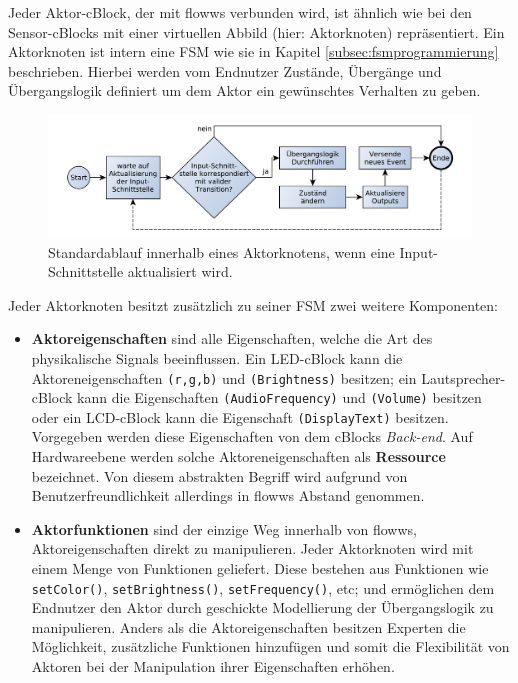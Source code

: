 Jeder Aktor-cBlock, der mit flowws verbunden wird, ist ähnlich wie bei den Sensor-cBlocks mit einer virtuellen Abbild (hier: Aktorknoten) repräsentiert. Ein Aktorknoten ist intern eine \ac{FSM} wie sie in Kapitel \ref{subsec:fsmprogrammierung} beschrieben. Hierbei werden vom Endnutzer Zustände, Übergänge und Übergangslogik definiert um dem Aktor ein gewünschtes Verhalten zu geben.

 \begin{figure}[h]
  \centering
  \includegraphics[width=1\textwidth]{bilder/chapter4/chapter4_2/aktorblockablauf.pdf}
  \caption{Standardablauf innerhalb eines Aktorknotens, wenn eine Input-Schnittstelle aktualisiert wird.}
  \label{fig:seqaktorblock}
\end{figure}

Jeder Aktorknoten besitzt zusätzlich zu seiner \ac{FSM} zwei weitere Komponenten:
\begin{itemize}
    \item \textbf{Aktoreigenschaften} sind alle Eigenschaften, welche die Art des physikalische Signals beeinflussen. Ein LED-cBlock kann die Aktoreneigenschaften \texttt{(r,g,b)} und \texttt{(Brightness)} besitzen; ein Lautsprecher-cBlock kann die Eigenschaften \texttt{(AudioFrequency)} und \texttt{(Volume)} besitzen oder ein LCD-cBlock kann die Eigenschaft \texttt{(DisplayText)} besitzen. Vorgegeben werden diese Eigenschaften von dem cBlocks \textit{Back-end}. Auf Hardwareebene werden solche Aktoreneigenschaften als \textbf{Ressource} bezeichnet. Von diesem abstrakten Begriff wird aufgrund von Benutzerfreundlichkeit allerdings in flowws Abstand genommen.
    \item \textbf{Aktorfunktionen} sind der einzige Weg innerhalb von flowws, Aktoreigenschaften direkt zu manipulieren. Jeder Aktorknoten wird mit einem Menge von Funktionen geliefert. Diese bestehen aus Funktionen wie \texttt{setColor()}, \texttt{setBrightness()}, \texttt{setFrequency()}, etc; und ermöglichen dem Endnutzer den Aktor durch geschickte Modellierung der Übergangslogik zu manipulieren. Anders als die Aktoreigenschaften besitzen Experten die Möglichkeit, zusätzliche Funktionen hinzufügen und somit die Flexibilität von Aktoren bei der Manipulation ihrer Eigenschaften erhöhen.
\end{itemize}

